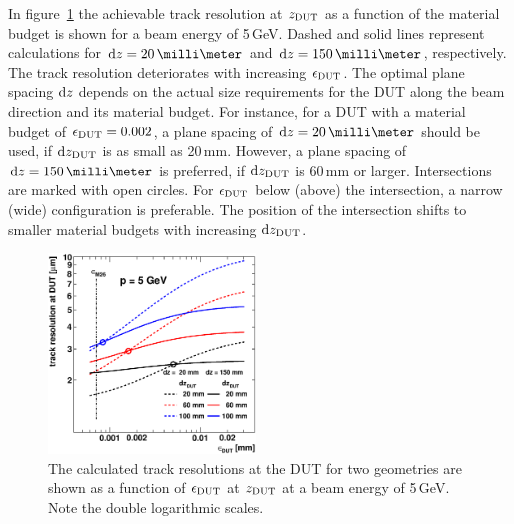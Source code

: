 In figure~\ref{fig:CalcResoP_DUT} the achievable track resolution at $z_{\textrm{DUT}}$ as a function of the material budget is shown for a beam energy of 5\,GeV.
Dashed and solid lines represent calculations for $\dz = 20\,\milli\meter$ and $\dz = 150\,\milli\meter$, respectively. 
The track resolution deteriorates with increasing $\mathnormal{\epsilon_{\textrm{DUT}}}$. 
The optimal plane spacing $\textrm{d}z$ depends on the actual size requirements for the DUT along the beam direction and its material budget.
For instance, for a DUT with a material budget of $\mathnormal{\epsilon_{\textrm{DUT}}} = 0.002$, a plane spacing of $\dz = 20\,\milli\meter$ should be used, if $\textrm{d}z_{\textrm{DUT}}$ is as small as 20\,mm. 
However, a plane spacing of $\dz = 150\,\milli\meter$ is preferred, if $\textrm{d}z_{\textrm{DUT}}$ is 60\,mm or larger. 
Intersections are marked with open circles. 
For $\mathnormal{\epsilon_{\textrm{DUT}}}$ below (above) the intersection, a narrow (wide) configuration is preferable. 
The position of the intersection shifts to smaller material budgets with increasing $\textrm{d}z_{\textrm{DUT}}$. 

\begin{figure}[tbp]
  \centering
  \includegraphics[width=0.49\textwidth]{figures/trackres_vs_epsdut_DESY} %
   \caption[Track resolution as a function of the beam energy]{
   The calculated track resolutions at the DUT for two geometries are shown as a function of $\mathnormal{\epsilon_{\textrm{DUT}}}$ at $z_{\textrm{DUT}}$ at a beam energy of 5\,GeV. 
   Note the double logarithmic scales. 
   }
 \label{fig:CalcResoP_DUT}
\end{figure}


